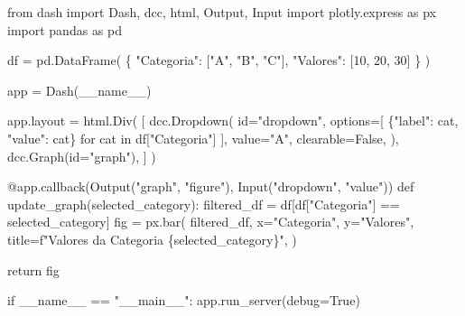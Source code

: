 \documentclass[
  12pt,
  a4paper,
]{scrreprt}
\newenvironment{Shaded}{}{}
\newcommand{\AttributeTok}[1]{\textcolor[rgb]{0.84,0.23,0.29}{#1}}
\newcommand{\BuiltInTok}[1]{\textcolor[rgb]{0.84,0.23,0.29}{#1}}
\newcommand{\ControlFlowTok}[1]{\textcolor[rgb]{0.84,0.23,0.29}{#1}}
\newcommand{\DecValTok}[1]{\textcolor[rgb]{0.00,0.36,0.77}{#1}}
\newcommand{\ImportTok}[1]{\textcolor[rgb]{0.01,0.18,0.38}{#1}}
\newcommand{\KeywordTok}[1]{\textcolor[rgb]{0.84,0.23,0.29}{#1}}
\newcommand{\NormalTok}[1]{\textcolor[rgb]{0.14,0.16,0.18}{#1}}
\newcommand{\OperatorTok}[1]{\textcolor[rgb]{0.14,0.16,0.18}{#1}}
\newcommand{\SpecialCharTok}[1]{\textcolor[rgb]{0.00,0.36,0.77}{#1}}
\newcommand{\SpecialStringTok}[1]{\textcolor[rgb]{0.01,0.18,0.38}{#1}}
\newcommand{\StringTok}[1]{\textcolor[rgb]{0.01,0.18,0.38}{#1}}
\newcommand{\VariableTok}[1]{\textcolor[rgb]{0.89,0.38,0.04}{#1}}
\begin{document}
\begin{Shaded}
\begin{Highlighting}[]
\ImportTok{from}\NormalTok{ dash }\ImportTok{import}\NormalTok{ Dash, dcc, html, Output, Input}
\ImportTok{import}\NormalTok{ plotly.express }\ImportTok{as}\NormalTok{ px}
\ImportTok{import}\NormalTok{ pandas }\ImportTok{as}\NormalTok{ pd}

\NormalTok{df }\OperatorTok{=}\NormalTok{ pd.DataFrame(}
\NormalTok{    \{}
        \StringTok{"Categoria"}\NormalTok{: [}\StringTok{"A"}\NormalTok{, }\StringTok{"B"}\NormalTok{, }\StringTok{"C"}\NormalTok{],}
        \StringTok{"Valores"}\NormalTok{: [}\DecValTok{10}\NormalTok{, }\DecValTok{20}\NormalTok{, }\DecValTok{30}\NormalTok{]}
\NormalTok{    \}}
\NormalTok{)}

\NormalTok{app }\OperatorTok{=}\NormalTok{ Dash(}\VariableTok{\_\_name\_\_}\NormalTok{)}

\NormalTok{app.layout }\OperatorTok{=}\NormalTok{ html.Div(}
\NormalTok{    [}
\NormalTok{        dcc.Dropdown(}
            \BuiltInTok{id}\OperatorTok{=}\StringTok{"dropdown"}\NormalTok{,}
\NormalTok{            options}\OperatorTok{=}\NormalTok{[}
\NormalTok{                \{}\StringTok{"label"}\NormalTok{: cat, }\StringTok{"value"}\NormalTok{: cat\}}
                \ControlFlowTok{for}\NormalTok{ cat }\KeywordTok{in}\NormalTok{ df[}\StringTok{"Categoria"}\NormalTok{]}
\NormalTok{            ],}
\NormalTok{            value}\OperatorTok{=}\StringTok{"A"}\NormalTok{,}
\NormalTok{            clearable}\OperatorTok{=}\VariableTok{False}\NormalTok{,}
\NormalTok{        ),}
\NormalTok{        dcc.Graph(}\BuiltInTok{id}\OperatorTok{=}\StringTok{"graph"}\NormalTok{),}
\NormalTok{    ]}
\NormalTok{)}


\AttributeTok{@app.callback}\NormalTok{(Output(}\StringTok{"graph"}\NormalTok{, }\StringTok{"figure"}\NormalTok{), Input(}\StringTok{"dropdown"}\NormalTok{, }\StringTok{"value"}\NormalTok{))}
\KeywordTok{def}\NormalTok{ update\_graph(selected\_category):}
\NormalTok{    filtered\_df }\OperatorTok{=}\NormalTok{ df[df[}\StringTok{"Categoria"}\NormalTok{] }\OperatorTok{==}\NormalTok{ selected\_category]}
\NormalTok{    fig }\OperatorTok{=}\NormalTok{ px.bar(}
\NormalTok{        filtered\_df,}
\NormalTok{        x}\OperatorTok{=}\StringTok{"Categoria"}\NormalTok{,}
\NormalTok{        y}\OperatorTok{=}\StringTok{"Valores"}\NormalTok{,}
\NormalTok{        title}\OperatorTok{=}\SpecialStringTok{f"Valores da Categoria }\SpecialCharTok{\{}\NormalTok{selected\_category}\SpecialCharTok{\}}\SpecialStringTok{"}\NormalTok{,}
\NormalTok{    )}

    \ControlFlowTok{return}\NormalTok{ fig}


\ControlFlowTok{if} \VariableTok{\_\_name\_\_} \OperatorTok{==} \StringTok{"\_\_main\_\_"}\NormalTok{:}
\NormalTok{    app.run\_server(debug}\OperatorTok{=}\VariableTok{True}\NormalTok{)}
\end{Highlighting}
\end{Shaded}
\end{document}
